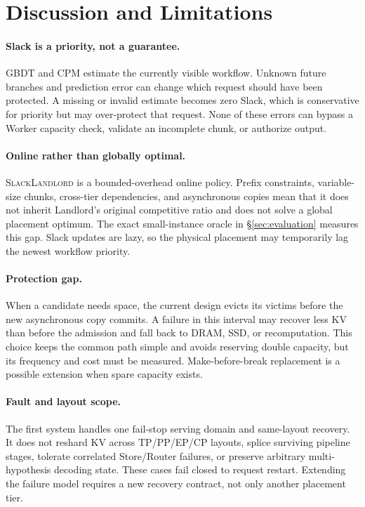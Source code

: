 \section{Discussion and Limitations}
\label{sec:discussion}

\paragraph{Slack is a priority, not a guarantee.}
GBDT and CPM estimate the currently visible workflow.  Unknown future branches
and prediction error can change which request should have been protected.  A
missing or invalid estimate becomes zero Slack, which is conservative for
priority but may over-protect that request.  None of these errors can bypass a
Worker capacity check, validate an incomplete chunk, or authorize output.

\paragraph{Online rather than globally optimal.}
\textsc{SlackLandlord} is a bounded-overhead online policy.  Prefix constraints,
variable-size chunks, cross-tier dependencies, and asynchronous copies mean
that it does not inherit Landlord's original competitive ratio and does not
solve a global placement optimum.  The exact small-instance oracle in
\S\ref{sec:evaluation} measures this gap.  Slack updates are lazy, so the
physical placement may temporarily lag the newest workflow priority.

\paragraph{Protection gap.}
When a candidate needs space, the current design evicts its victims before the
new asynchronous copy commits.  A failure in this interval may recover less KV
than before the admission and fall back to DRAM, SSD, or recomputation.  This
choice keeps the common path simple and avoids reserving double capacity, but
its frequency and cost must be measured.  Make-before-break replacement is a
possible extension when spare capacity exists.

\paragraph{Fault and layout scope.}
The first system handles one fail-stop serving domain and same-layout recovery.
It does not reshard KV across TP/PP/EP/CP layouts, splice surviving pipeline
stages, tolerate correlated Store/Router failures, or preserve arbitrary
multi-hypothesis decoding state.  These cases fail closed to request restart.
Extending the failure model requires a new recovery contract, not only another
placement tier.
